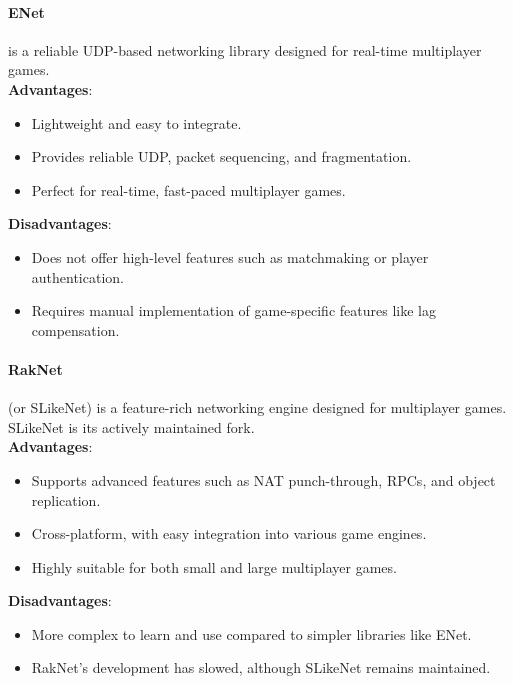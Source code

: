 \documentclass{article} %
\begin{document}
\paragraph{ENet} is a reliable UDP-based networking library designed for real-time multiplayer games.
\\
\textbf{Advantages}:
\begin{itemize}
	\item Lightweight and easy to integrate.
	\item Provides reliable UDP, packet sequencing, and fragmentation.
	\item Perfect for real-time, fast-paced multiplayer games.
\end{itemize}
\textbf{Disadvantages}:
\begin{itemize}
	\item Does not offer high-level features such as matchmaking or player authentication.
	\item Requires manual implementation of game-specific features like lag compensation.
\end{itemize}

\paragraph{RakNet} (or SLikeNet) is a feature-rich networking engine designed for multiplayer games. SLikeNet is its actively maintained fork.
\\
\textbf{Advantages}:
\begin{itemize}
	\item Supports advanced features such as NAT punch-through, RPCs, and object replication.
	\item Cross-platform, with easy integration into various game engines.
	\item Highly suitable for both small and large multiplayer games.
\end{itemize}
\textbf{Disadvantages}:
\begin{itemize}
	\item More complex to learn and use compared to simpler libraries like ENet.
	\item RakNet’s development has slowed, although SLikeNet remains maintained.
\end{itemize}
\end{document}
